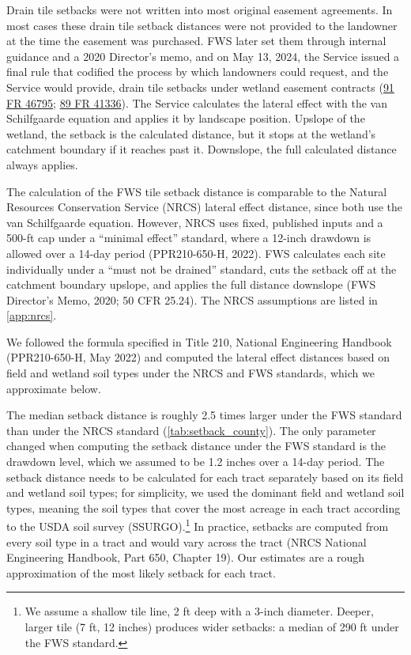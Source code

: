 \documentclass{theme/arpc-memo}
\begin{document}
Drain tile setbacks were not written into most original easement agreements. In most cases these drain tile setback distances were not provided to the landowner at the time the easement was purchased. FWS later set them through internal guidance and a 2020 Director's memo, and on May 13, 2024, the Service issued a final rule that codified the process by which landowners could request, and the Service would provide, drain tile setbacks under wetland easement contracts (\href{https://www.federalregister.gov/citation/91-FR-46795}{91 FR 46795}; \href{https://www.federalregister.gov/citation/89-FR-41336}{89 FR 41336}). The Service calculates the lateral effect with the van Schilfgaarde equation and applies it by landscape position. Upslope of the wetland, the setback is the calculated distance, but it stops at the wetland's catchment boundary if it reaches past it. Downslope, the full calculated distance always applies.

The calculation of the FWS tile setback distance is comparable to the Natural Resources Conservation Service (NRCS) lateral effect distance, since both use the van Schilfgaarde equation. However, NRCS uses fixed, published inputs and a 500-ft cap under a ``minimal effect'' standard, where a 12-inch drawdown is allowed over a 14-day period (PPR210-650-H, 2022). FWS calculates each site individually under a ``must not be drained'' standard, cuts the setback off at the catchment boundary upslope, and applies the full distance downslope (FWS Director's Memo, 2020; 50 CFR 25.24). The NRCS assumptions are listed in \autoref{app:nrcs}.

We followed the formula specified in Title 210, National Engineering Handbook (PPR210-650-H, May 2022) and computed the lateral effect distances based on field and wetland soil types under the NRCS and FWS standards, which we approximate below.

The median setback distance is roughly 2.5 times larger under the FWS standard than under the NRCS standard (\autoref{tab:setback_county}). The only parameter changed when computing the setback distance under the FWS standard is the drawdown level, which we assumed to be 1.2 inches over a 14-day period. The setback distance needs to be calculated for each tract separately based on its field and wetland soil types; for simplicity, we used the dominant field and wetland soil types, meaning the soil types that cover the most acreage in each tract according to the USDA soil survey (SSURGO).\footnote{We assume a shallow tile line, 2 ft deep with a 3-inch diameter. Deeper, larger tile (7 ft, 12 inches) produces wider setbacks: a median of 290 ft under the FWS standard.} In practice, setbacks are computed from every soil type in a tract and would vary across the tract (NRCS National Engineering Handbook, Part 650, Chapter 19). Our estimates are a rough approximation of the most likely setback for each tract.
\end{document}
